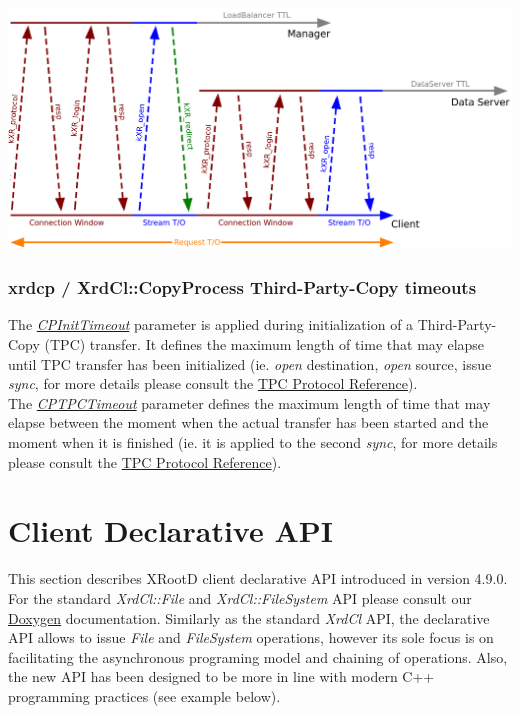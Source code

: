 \documentclass{article}
\begin{document}
			\begin{center}
   				\includegraphics[scale=0.25]{timeout.png}
   			\end{center}

			
		\subsubsection{xrdcp / XrdCl::CopyProcess Third-Party-Copy timeouts}
			The \hyperref[env:cpinittimeout]{\textit{CPInitTimeout}} parameter is applied during initialization of a Third-Party-Copy (TPC) transfer.
			It defines the maximum length of time that may elapse until TPC transfer has been initialized (ie. \textit{open} destination, \textit{open}
			source, issue \textit{sync}, for more details please consult the \href{http://xrootd.org/doc/dev49/tpc_protocol.htm}{TPC Protocol Reference}). \\
			The \hyperref[env:cptpctimeout]{\textit{CPTPCTimeout}} parameter defines the maximum length of time that may elapse between the moment when
			the actual transfer has been started and the moment when it is finished (ie. it is applied to the second \textit{sync}, for more details please 
			consult the \href{http://xrootd.org/doc/dev49/tpc_protocol.htm}{TPC Protocol Reference}). 


\pagebreak

\section{Client Declarative API}

	This section describes XRootD client declarative API introduced in version 4.9.0. For the standard 
	\textit{XrdCl::File} and \textit{XrdCl::FileSystem} API please consult our \href{http://xrootd.org/doc/doxygen/current/html/annotated.html}
	{Doxygen} documentation. Similarly as the standard \textit{XrdCl} API, the declarative API allows to issue \textit{File} and \textit{FileSystem}
	operations, however its sole focus is on facilitating the asynchronous programing model and chaining of operations. Also, the new API has been
	designed to be more in line with modern C++ programming practices (see example below). 
	
\end{document}
